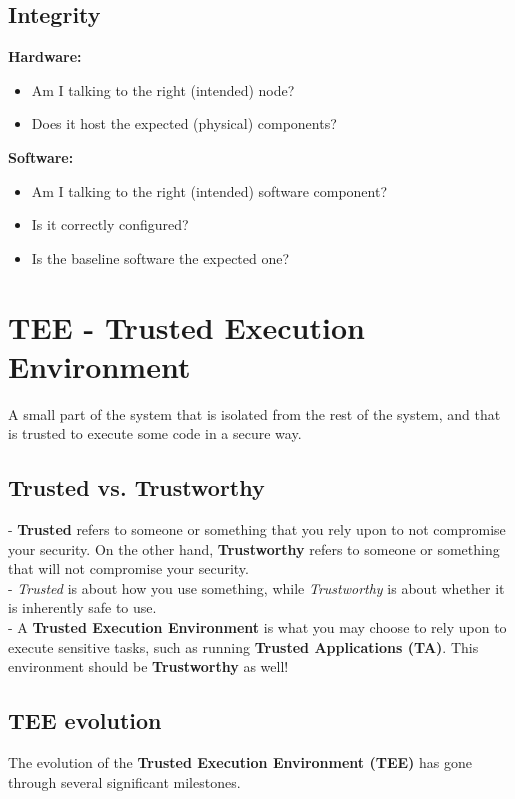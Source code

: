\subsection{Integrity}
\textbf{Hardware:}
\begin{itemize}[itemsep=0pt]
    \item Am I talking to the right (intended) node?
    \item Does it host the expected (physical) components?
\end{itemize}

\textbf{Software:}
\begin{itemize}[itemsep=0pt]
    \item Am I talking to the right (intended) software component?
    \item Is it correctly configured?
    \item Is the baseline software the expected one?
\end{itemize}

\section{TEE - Trusted Execution Environment}

A small part of the system that is isolated from the rest of the system, and that is trusted to execute some code in a secure way.

\subsection{Trusted vs. Trustworthy}

- \textbf{Trusted} refers to someone or something that you rely upon to not compromise your security. On the other hand, \textbf{Trustworthy} refers to someone or something that will not compromise your security. \\
- \textit{Trusted} is about how you use something, while \textit{Trustworthy} is about whether it is inherently safe to use. \\
- A \textbf{Trusted Execution Environment} is what you may choose to rely upon to execute sensitive tasks, such as running \textbf{Trusted Applications (TA)}. This environment should be \textbf{Trustworthy} as well!

\subsection{TEE evolution}
The evolution of the \textbf{Trusted Execution Environment (TEE)} has gone through several significant milestones. \bigskip

